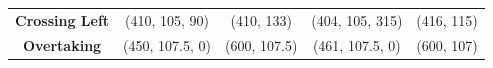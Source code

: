 \begin{table}
\begin{tabular}{ccccc}
    \textbf{Crossing Left}                                                                                  & (410, 105, 90)                                                                                 & (410, 133)                                                                   & (404, 105, 315)                                                                                & (416, 115)                                                                    \\
    \textbf{Overtaking}                                                                                     & (450, 107.5, 0)                                                                                & (600, 107.5)                                                                 & (461, 107.5, 0)                                                                                & (600, 107)                                                                    \\
    \bottomrule
    \end{tabular}
    \label{tab:simulation_scenarios_configuration_own_vessel}
\end{table}
    
